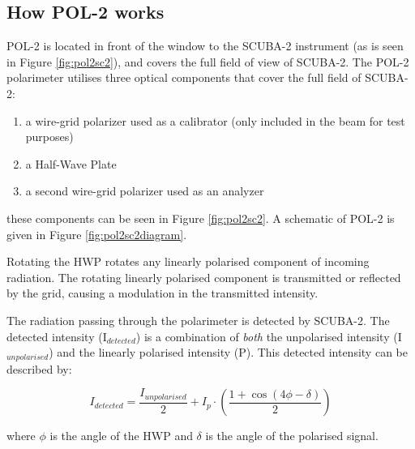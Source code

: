 \subsection*{How POL-2 works}

POL-2 is located in front of the window to the SCUBA-2 instrument
(as is seen in Figure \ref{fig:pol2sc2}), and covers the full
field of view of SCUBA-2. The POL-2 polarimeter
utilises three optical components
that cover the full field of SCUBA-2:

\begin{enumerate}\itemsep-0.2em
\item a wire-grid polarizer used as a calibrator (only included in the
beam for test purposes)
\item a Half-Wave Plate
\item a second wire-grid polarizer used as an analyzer
\end{enumerate}


these components can be seen in Figure \ref{fig:pol2sc2}. 
A schematic of POL-2 is given in Figure \ref{fig:pol2sc2diagram}.


Rotating the HWP rotates any linearly polarised component of incoming
radiation. The rotating linearly polarised component is
transmitted or reflected by the grid, causing a modulation in the transmitted
intensity.

The radiation passing through the polarimeter is detected by
SCUBA-2. The detected intensity (I$_{detected}$) is a
combination of \emph{both} the unpolarised intensity (I$_{unpolarised}$)
and the linearly polarised intensity (P). This detected intensity can be
described by:


\begin{equation}
I_{detected} = \frac{I_{unpolarised}}{2}+ I_{p}\cdot\left(\frac{1+\cos(4\phi - \delta)}{2} \right)
\end{equation}

where $\phi$ is the angle of the HWP and $\delta$ is the angle of the polarised signal.


